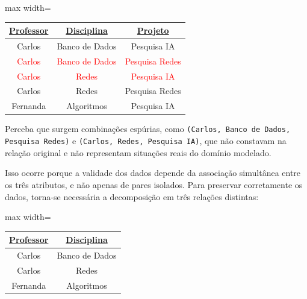 \begin{tcolorbox}[breakable, colback=blue!5,colframe=blue!40!black,title=Situação exemplo]
    \begin{adjustbox}{max width=\textwidth}
    \begin{tabular}{|c|c|c|}
    \hline
    \textbf{\underline{Professor}} & \textbf{\underline{Disciplina}} & \textbf{\underline{Projeto}} \\ \hline
    Carlos & Banco de Dados & Pesquisa IA \\ \hline
    \textcolor{red}{Carlos} & \textcolor{red}{Banco de Dados} & \textcolor{red}{Pesquisa Redes} \\ \hline
    \textcolor{red}{Carlos} & \textcolor{red}{Redes} & \textcolor{red}{Pesquisa IA} \\ \hline
    Carlos & Redes & Pesquisa Redes \\ \hline
    Fernanda & Algoritmos & Pesquisa IA \\ \hline
    \end{tabular}
\end{adjustbox}
    \vspace{0.3cm}

    \vspace{0.4cm}

    \justify

    Perceba que surgem combinações espúrias, como \texttt{(Carlos, Banco de Dados, Pesquisa Redes)} e \texttt{(Carlos, Redes, Pesquisa IA)}, que não constavam na relação original e não representam situações reais do domínio modelado.

    Isso ocorre porque a validade dos dados depende da associação simultânea entre os três atributos, e não apenas de pares isolados. Para preservar corretamente os dados, torna-se necessária a decomposição em três relações distintas:

    \vspace{0.5cm}

    \centering
    \renewcommand{\arraystretch}{1.2}

    \begin{adjustbox}{max width=\textwidth}
    \begin{tabular}{|c|c|}
    \hline
    \textbf{\underline{Professor}} & \textbf{\underline{Disciplina}} \\ \hline
    Carlos & Banco de Dados \\ \hline
    Carlos & Redes \\ \hline
    Fernanda & Algoritmos \\ \hline
    \end{tabular}
\end{adjustbox}
    \vspace{0.3cm}


\end{tcolorbox}
